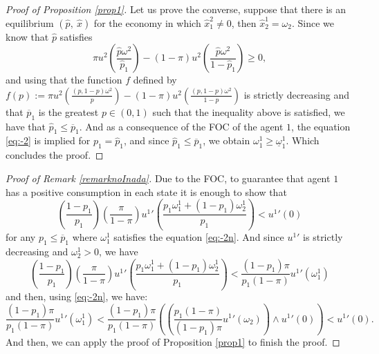 \documentclass[pdftex]{article}
\numberwithin{equation}{section}
\theoremstyle{th}
\newtheorem{proof lemma}{{Proof Lemma}.}
\theoremstyle{definition}
\newtheorem*{risk lovers}{Risk lovers}
\newtheorem*{risk averse}{Risk averse}
\begin{document}
{\begin{proof}[Proof of Proposition \ref{prop1}]
Let us prove the converse, suppose that there is an equilibrium $\left(\hat{p},\ \hat{x}\right)$ for the economy in which $\hat{x}^2_1\neq0$, then $\hat{x}^1_2=\omega_2$. Since we know that $\hat{p}$ satisfies
\[
\pi{u}^2\left(\frac{\hat{p}\omega^2}{\hat{p}_1}\right)-(1-\pi){u}^2\left(\frac{\hat{p}\omega^2}{1-\hat{p}_1}\right)\geq0,
\]
and using that the function $f$ defined by $f(p):=\pi{u}^2\left(\frac{\left({p},1-{p}\right)\omega^2}{{p}}\right)-(1-\pi){u}^2\left(\frac{\left({p},1-{p}\right)\omega^2}{1-{p}}\right)$ is strictly decreasing and that $\overline{p}_1$ is the greatest $p\in(0,1)$ such that the inequality above is satisfied, we have that $\hat{p}_1\leq\overline{p}_1$. And as a consequence of the FOC of the agent $1$, the equation \ref{eq:-2} is implied for $p_1=\hat{p}_1$, and since $\hat{p}_1\leq\overline{p}_1$, we obtain $\omega_1^1\geq\underline{\omega}_1^1$.
 Which concludes the proof.
\end{proof}
\begin{proof}[Proof of Remark \ref{remarknoInada}]
Due to the FOC, to guarantee that agent $1$ has a positive consumption in each state it is enough to show that \begin{equation}
\left(\frac{1-p_1}{p_1}\right)\left(\frac{\pi}{1-\pi}\right){u^1}'\left(\frac{p_1\omega_{1}^{1}+\left(1-p_1\right)\omega_{2}^{1}}{p_1}\right)<{u^1}'\left(0\right)\label{eq:-7}
\end{equation}for any $p_1\leq\overline{p}_1$ where $\omega_1^1$ satisfies the equation \ref{eq:-2n}. And since ${u^1}'$ is strictly decreasing and $\omega^1_2>0$, we have\[\left(\frac{1-p_1}{p_1}\right)\left(\frac{\pi}{1-\pi}\right){u^1}'\left(\frac{p_1\omega_{1}^{1}+\left(1-p_1\right)\omega_{2}^{1}}{p_1}\right)<\frac{(1-p_1)\pi}{p_1(1-\pi)}{u^1}'\left(\omega^1_1\right)\]
and then, using \ref{eq:-2n}, we have:
\[
\frac{(1-p_1)\pi}{p_1(1-\pi)}{u^1}'\left(\omega^1_1\right)<\frac{(1-p_1)\pi}{p_1(1-\pi)}\left(\left(\frac{p_1(1-\pi)}{(1-p_1)\pi}{u^1}'\left(\omega_{2}\right)\right)\wedge{u^1}'\left(0\right)\right)<{u^1}'(0).
\]
And then, we can apply the proof of Proposition \ref{prop1} to finish the proof.


\end{proof}}
\end{document}
